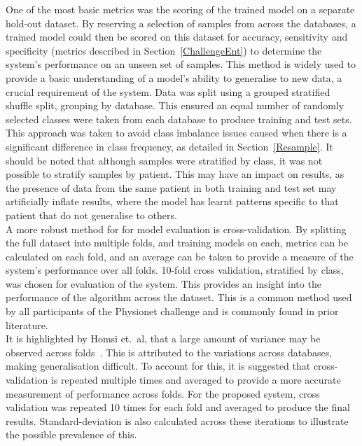 \documentclass[titlepage, 12pt]{scrartcl} \usepackage{enumitem}
\begin{document}
One of the most basic metrics was the scoring of the trained model on a
separate hold-out dataset. By reserving a selection of samples from across the
databases, a trained model could then be scored on this dataset for accuracy, sensitivity and
specificity (metrics described in Section~\ref{ChallengeEnt}) to determine the
system's performance on an unseen set of samples. This method is widely used to
provide a basic understanding of a model's ability to generalise to new data, a
crucial requirement of the system. Data was split using a grouped stratified shuffle
split, grouping by database. This ensured an equal number of randomly selected
classes were taken from each database to produce training and test sets. This
approach was taken to avoid class imbalance issues caused when there is a
significant difference in class frequency, as detailed in
Section~\ref{Resample}. It should be noted that although samples were
stratified by class, it was not possible to stratify samples by patient. This
may have an impact on results, as the presence of data from the same patient in
both training and test set may artificially inflate results, where the model has
learnt patterns specific to that patient that do not generalise to others.\\

A more robust method for for model evaluation is cross-validation. By splitting
the full dataset into multiple folds, and training models on each, metrics can
be calculated on each fold, and an average can be taken to provide a measure of
the system's performance over all folds. 10-fold cross validation, stratified
by class, was chosen for evaluation of the system. This provides an insight
into the performance of the algorithm across the dataset. This is a common
method used by all participants of the Physionet challenge and is commonly found
in prior literature.\\
It is highlighted by Homsi et.\ al, that a large amount of variance may be
observed across folds~\parencite[p.1637]{Homsi2017}. This is attributed to the
variations across databases, making generalisation difficult. To account for
this, it is suggested that cross-validation is repeated multiple times and
averaged to provide a more accurate measurement of performance across folds.
For the proposed system, cross validation was repeated 10 times for each fold
and averaged to produce the final results. Standard-deviation is also
calculated across these iterations to illustrate the possible prevalence of
this.\\
\end{document}
